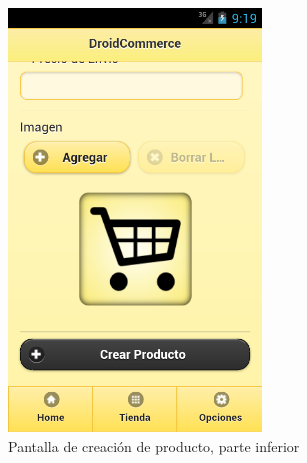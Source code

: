 \begin{figure}
  \centering
    \includegraphics[width=0.6\textwidth]{imagenes/capturas/crear-producto2.png}
        \caption{Pantalla de creación de producto, parte inferior}
    \label{fig:crear-producto2}
\end{figure}

